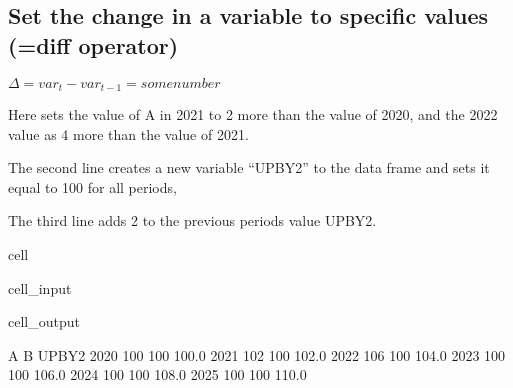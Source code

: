 \documentclass[letterpaper,10pt,english]{jupyterBook}
\begin{document}
\subsection{Set the change in a variable to specific values (=diff operator)}
\label{\detokenize{content/04_PythonEssentials/UpdateCommand:set-the-change-in-a-variable-to-specific-values-diff-operator}}
\sphinxAtStartPar
\(\Delta = var_t - var_{t-1} = some number\)

\sphinxAtStartPar
Here sets the value of A in 2021 to 2 more than the value of 2020, and the 2022 value as 4 more than the  value of 2021.

\sphinxAtStartPar
The second line creates a new variable “UPBY2” to the data frame and sets it equal to 100 for all periods,

\sphinxAtStartPar
The third line adds 2 to the previous periods value UPBY2.

\begin{sphinxuseclass}{cell}\begin{sphinxVerbatimInput}

\begin{sphinxuseclass}{cell_input}
\begin{sphinxVerbatim}[commandchars=\\\{\}]

\end{sphinxVerbatim}

\end{sphinxuseclass}\end{sphinxVerbatimInput}
\begin{sphinxVerbatimOutput}

\begin{sphinxuseclass}{cell_output}
\begin{sphinxVerbatim}[commandchars=\\\{\}]
        A    B  UPBY2
2020  100  100  100.0
2021  102  100  102.0
2022  106  100  104.0
2023  100  100  106.0
2024  100  100  108.0
2025  100  100  110.0
\end{sphinxVerbatim}

\end{sphinxuseclass}\end{sphinxVerbatimOutput}

\end{sphinxuseclass}
\end{document}

